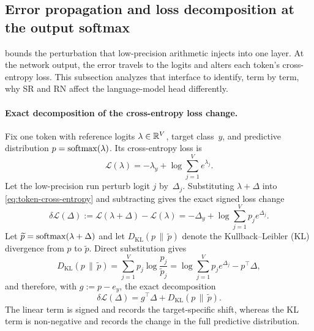 \FloatBarrier
\subsection{Error propagation and loss decomposition at the output softmax}
\label{sec:analysis-softmax}

 bounds the perturbation that low-precision arithmetic
injects into one layer.  At the network output, the error travels to the logits
and alters each token's cross-entropy loss.
This subsection analyzes that interface to identify, term by term,
why SR and RN affect the language-model head differently.

\paragraph{Exact decomposition of the cross-entropy loss change.}
Fix one token with reference logits $\lambda\in\mathbb{R}^V$, target class~$y$, and
predictive distribution $p=\operatorname{softmax}(\lambda)$.  Its cross-entropy loss is
\begin{equation}
  \mathcal L(\lambda)=-\lambda_y+\log\sum_{j=1}^Ve^{\lambda_j}.
  \label{eq:token-cross-entropy}
\end{equation}
Let the low-precision run perturb logit $j$ by~$\Delta_j$.  Substituting
$\lambda+\Delta$ into \cref{eq:token-cross-entropy} and subtracting gives
the exact signed loss change
\begin{equation*}
  \delta\mathcal L(\Delta)
  :=\mathcal L(\lambda+\Delta)-\mathcal L(\lambda)
  =-\Delta_y+\log\sum_{j=1}^Vp_je^{\Delta_j}.
\end{equation*}
Let $\widetilde p=\operatorname{softmax}(\lambda+\Delta)$ and let
$D_{\mathrm{KL}}(p\,\|\,\widetilde p)$ denote the Kullback--Leibler (KL)
divergence from $p$ to $\widetilde p$. Direct substitution gives
\begin{equation*}
  D_{\mathrm{KL}}(p\,\|\,\widetilde p)
  =\sum_{j=1}^V p_j\log\frac{p_j}{\widetilde p_j}
  =\log\sum_{j=1}^V p_j e^{\Delta_j}-p^\top\Delta,
\end{equation*}
and therefore, with $g:=p-e_y$, the exact decomposition
\begin{equation}
  \delta\mathcal L(\Delta)
  =g^\top\Delta+D_{\mathrm{KL}}(p\,\|\,\widetilde p).
  \label{eq:one-token-kl-decomposition}
\end{equation}
The linear term is signed and records the target-specific shift, whereas the
KL term is non-negative and records the change in the full predictive
distribution.

